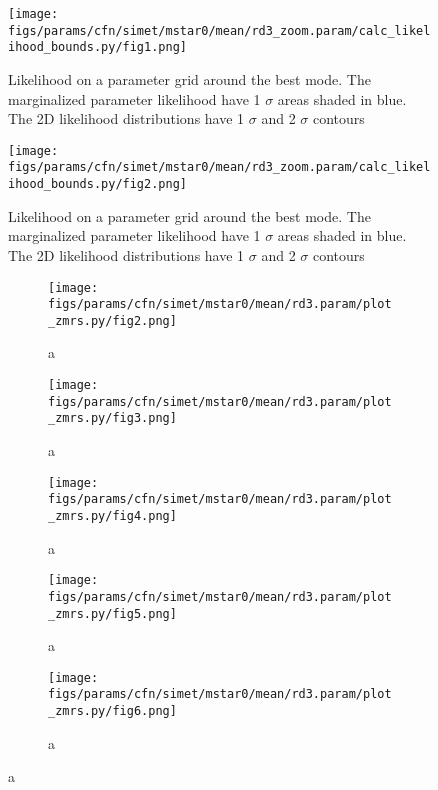 \documentclass[twocolumn]{article}
\begin{document}
\begin{figure}[H]
  \center\texttt{[image: figs/params/cfn/simet/mstar0/mean/rd3\_zoom.param/calc\_likelihood\_bounds.py/fig1.png]}
  \caption{Likelihood on a parameter grid around the best mode. The marginalized parameter likelihood have
    1 $\sigma$ areas shaded in blue. The 2D likelihood distributions have 1 $\sigma$  and 2 $\sigma$ contours}
  \label{fig:basic_rd:likelihood}
\end{figure}

\begin{figure}[H]
  \center\texttt{[image: figs/params/cfn/simet/mstar0/mean/rd3\_zoom.param/calc\_likelihood\_bounds.py/fig2.png]}
  \caption{Likelihood on a parameter grid around the best mode. The marginalized parameter likelihood have
    1 $\sigma$ areas shaded in blue. The 2D likelihood distributions have 1 $\sigma$  and 2 $\sigma$ contours}
  \label{fig:basic_rd:likelihood}
\end{figure}


\begin{figure}
  \begin{subfigure}{.5\textwidth}
    \centering\texttt{[image: figs/params/cfn/simet/mstar0/mean/rd3.param/plot\_zmrs.py/fig2.png]}
    \caption{a}
  \end{subfigure}
  \begin{subfigure}{.5\textwidth}
    \centering\texttt{[image: figs/params/cfn/simet/mstar0/mean/rd3.param/plot\_zmrs.py/fig3.png]}
    \caption{a}
  \end{subfigure}
  \begin{subfigure}{.5\textwidth}
    \centering\texttt{[image: figs/params/cfn/simet/mstar0/mean/rd3.param/plot\_zmrs.py/fig4.png]}
    \caption{a}
  \end{subfigure}%
  \begin{subfigure}{.5\textwidth}
    \centering\texttt{[image: figs/params/cfn/simet/mstar0/mean/rd3.param/plot\_zmrs.py/fig5.png]}
    \caption{a}
  \end{subfigure}
  \begin{subfigure}{.5\textwidth}
    \centering\texttt{[image: figs/params/cfn/simet/mstar0/mean/rd3.param/plot\_zmrs.py/fig6.png]}
    \caption{a}
  \end{subfigure}
  
\end{figure}
\clearpage
\end{document}
